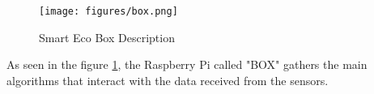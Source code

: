 \begin{figure}[H]
\centering
\texttt{[image: figures/box.png]}
\caption{Smart Eco Box Description}
\label{fig:boxDescription}
\end{figure}

As seen in the figure \ref{fig:boxDescription}, the Raspberry Pi called "BOX" gathers the main algorithms that interact with the data
received from the sensors.

